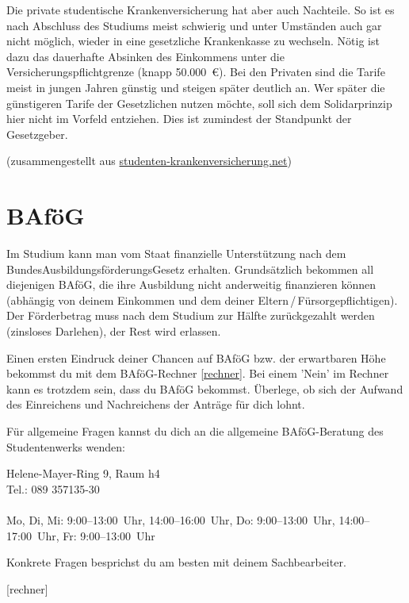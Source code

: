 Die private studentische Krankenversicherung hat aber auch Nachteile. So ist es nach
Abschluss des Studiums meist schwierig und unter Umständen auch gar
nicht möglich, wieder in eine gesetzliche Krankenkasse zu
wechseln. Nötig ist dazu das dauerhafte Absinken des Einkommens unter
die Versicherungspflichtgrenze (knapp 50.000~€). Bei den Privaten sind
die Tarife meist in jungen Jahren günstig und steigen später deutlich
an. Wer später die günstigeren Tarife der Gesetzlichen nutzen möchte,
soll sich dem Solidarprinzip hier nicht im Vorfeld entziehen. Dies ist
zumindest der Standpunkt der Gesetzgeber.

{\footnotesize (zusammengestellt aus {\url{studenten-krankenversicherung.net}})}

\section{BAföG}
Im Studium kann man vom Staat finanzielle Unterstützung nach dem BundesAusbildungsförderungsGesetz erhalten. Grundsätzlich bekommen all diejenigen BAföG, die ihre Ausbildung nicht anderweitig finanzieren können (abhängig von deinem Einkommen und dem deiner Eltern\,/\,Fürsorgepflichtigen). Der Förderbetrag muss nach dem Studium zur Hälfte zurückgezahlt werden (zinsloses Darlehen), der Rest wird erlassen.

Einen ersten Eindruck deiner Chancen auf BAföG bzw. der erwartbaren
Höhe bekommst du mit dem BAföG-Rechner \ref{rechner}. Bei einem 'Nein' im Rechner kann es trotzdem sein, dass du BAföG
bekommst. Überlege, ob sich der Aufwand des Einreichens und
Nachreichens der Anträge für dich lohnt.

Für allgemeine Fragen kannst du dich an die allgemeine BAföG-Beratung des Studentenwerks wenden:

Helene-Mayer-Ring 9, Raum h4\\
Tel.: 089 357135-30\\
\\
Mo, Di, Mi: 9:00--13:00~Uhr, 14:00--16:00~Uhr, Do: 9:00--13:00~Uhr, 14:00--17:00~Uhr, Fr: 9:00--13:00~Uhr

Konkrete Fragen besprichst du am besten mit deinem Sachbearbeiter.

\begin{urlList}
	[rechner]
\end{urlList}

